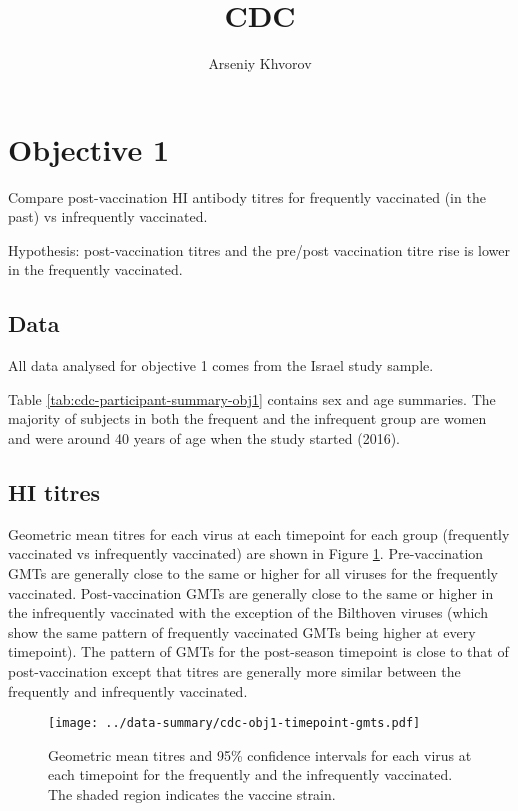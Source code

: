 \documentclass[12pt]{article}
\title{CDC}
\author{Arseniy Khvorov}
\begin{document}
\maketitle

\section{Objective 1}

Compare post-vaccination HI antibody titres for frequently vaccinated (in the past) vs infrequently vaccinated.

Hypothesis: post-vaccination titres and the pre/post vaccination titre rise
is lower in the frequently vaccinated.

\subsection{Data}

All data analysed for objective 1 comes from the Israel study sample.

Table \ref{tab:cdc-participant-summary-obj1} contains sex and age summaries.
The majority of subjects in both the frequent and the infrequent group are
women and were around 40 years of age when the study started (2016).



\subsection{HI titres}

Geometric mean titres for each virus at each timepoint for each group (frequently
vaccinated vs infrequently vaccinated) are shown in Figure
\ref{fig:cdc-obj1-timepoint-gmts}.
Pre-vaccination GMTs are generally close to the same
or higher for all viruses for the frequently vaccinated.
Post-vaccination GMTs are generally close to the same or higher in the infrequently vaccinated with
the exception of the Bilthoven viruses (which show the same pattern
of frequently vaccinated GMTs being higher at every
timepoint). The pattern of GMTs for the post-season timepoint is close to that
of post-vaccination except that titres are generally more similar between the
frequently and infrequently vaccinated.

\begin{figure}
	\texttt{[image: ../data-summary/cdc-obj1-timepoint-gmts.pdf]}
	\caption{Geometric mean titres and 95\% confidence intervals for each virus at each timepoint for the frequently and the infrequently vaccinated. The shaded region indicates the vaccine strain.}
	\label{fig:cdc-obj1-timepoint-gmts}
\end{figure}
\end{document}
